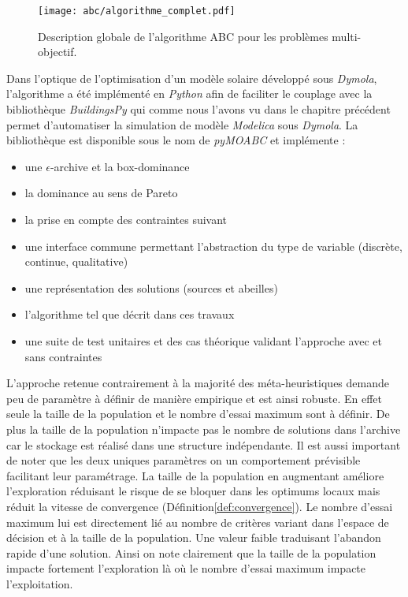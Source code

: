 \begin{figure}
    \begin{center}
        \texttt{[image: abc/algorithme\_complet.pdf]}
    \end{center}
    \caption{Description globale de l’algorithme ABC pour les problèmes multi-objectif.
             \label{fig:abc_complet}}
\end{figure}

Dans l’optique de l’optimisation d’un modèle solaire développé sous \emph{Dymola}, l’algorithme
a été implémenté en \emph{Python} afin de faciliter le couplage avec la bibliothèque
\emph{BuildingsPy} qui comme nous l’avons vu dans le chapitre précédent permet d’automatiser
la simulation de modèle \emph{Modelica} sous \emph{Dymola}. La bibliothèque est
disponible sous le nom de \emph{pyMOABC} et implémente :
\begin{itemize}
  \item une $\epsilon$-archive et la box-dominance
  \item la dominance au sens de Pareto
  \item la prise en compte des contraintes suivant \cite{Woldesenbet20073077}
  \item une interface commune permettant l’abstraction du type de variable (discrète, continue, qualitative)
  \item une représentation des solutions (sources et abeilles)
  \item l’algorithme tel que décrit dans ces travaux
  \item une suite de test unitaires et des cas théorique validant l’approche avec
        et sans contraintes
\end{itemize}

L’approche retenue contrairement à la majorité des méta-heuristiques demande
peu de paramètre à définir de manière empirique et est ainsi robuste. En effet
seule la taille de la population et le nombre d’essai maximum sont à définir.
De plus la taille de la population n’impacte pas le nombre de solutions dans l’archive
car le stockage est réalisé dans une structure indépendante. Il est aussi important
de noter que les deux uniques paramètres on un comportement prévisible facilitant
leur paramétrage. La taille de la population en augmentant améliore l’exploration réduisant le risque
de se bloquer dans les optimums locaux mais réduit la vitesse de convergence (Définition\ref{def:convergence}).
Le nombre d’essai maximum lui est directement lié au nombre de critères variant
dans l’espace de décision et à la taille de la population. Une valeur faible traduisant
l’abandon rapide d’une solution. Ainsi on note clairement que la taille de la population
impacte fortement l’exploration là où le nombre d’essai maximum impacte l’exploitation.

